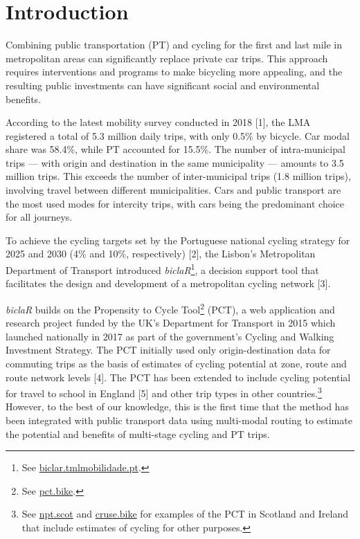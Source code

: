 \documentclass[runningheads]{llncs}
\begin{document}
\hypertarget{introduction}{%
\section{Introduction}\label{introduction}}

Combining public transportation (PT) and cycling for the first and last
mile in metropolitan areas can significantly replace private car trips.
This approach requires interventions and programs to make bicycling more
appealing, and the resulting public investments can have significant
social and environmental benefits.

According to the latest mobility survey conducted in 2018 {[}1{]}, the
LMA registered a total of 5.3 million daily trips, with only 0.5\% by
bicycle. Car modal share was 58.4\%, while PT accounted for 15.5\%. The
number of intra-municipal trips --- with origin and destination in the
same municipality --- amounts to 3.5 million trips. This exceeds the
number of inter-municipal trips (1.8 million trips), involving travel
between different municipalities. Cars and public transport are the most
used modes for intercity trips, with cars being the predominant choice
for all journeys.

To achieve the cycling targets set by the Portuguese national cycling
strategy for 2025 and 2030 (4\% and 10\%, respectively) {[}2{]}, the
Lisbon's Metropolitan Department of Transport introduced
\emph{biclaR}\footnote{See
  \href{https://biclar.tmlmobilidade.pt/}{biclar.tmlmobilidade.pt}.}, a
decision support tool that facilitates the design and development of a
metropolitan cycling network {[}3{]}.

\emph{biclaR} builds on the Propensity to Cycle Tool\footnote{See
  \href{https://www.pct.bike/}{pct.bike}.} (PCT), a web application and
research project funded by the UK's Department for Transport in 2015
which launched nationally in 2017 as part of the government's Cycling
and Walking Investment Strategy. The PCT initially used only
origin-destination data for commuting trips as the basis of estimates of
cycling potential at zone, route and route network levels {[}4{]}. The
PCT has been extended to include cycling potential for travel to school
in England {[}5{]} and other trip types in other countries.\footnote{See
  \href{https://www.npt.scot}{npt.scot} and
  \href{https://cruse.bike}{cruse.bike} for examples of the PCT in
  Scotland and Ireland that include estimates of cycling for other
  purposes.} However, to the best of our knowledge, this is the first
time that the method has been integrated with public transport data
using multi-modal routing to estimate the potential and benefits of
multi-stage cycling and PT trips.
\end{document}
